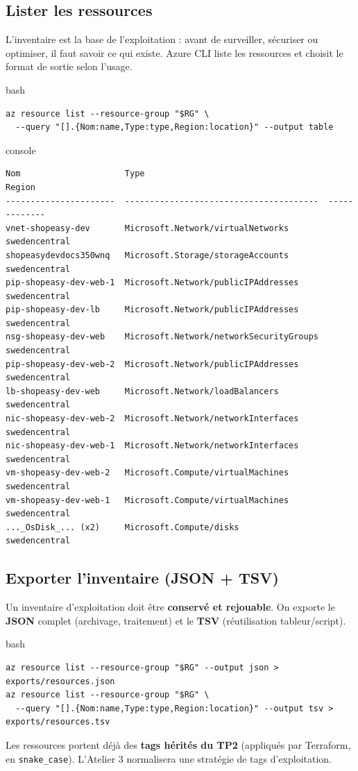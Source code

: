 \documentclass[11pt,a4paper]{article}
\newcommand{\code}[1]{\texttt{#1}}
\begin{document}
\subsection{Lister les ressources}
L'inventaire est la base de l'exploitation : avant de surveiller, sécuriser ou optimiser, il faut savoir ce qui existe. Azure CLI liste les ressources et choisit le format de sortie selon l'usage.
\begin{codebox}{bash}
\begin{Verbatim}
az resource list --resource-group "$RG" \
  --query "[].{Nom:name,Type:type,Region:location}" --output table
\end{Verbatim}
\end{codebox}
\begin{codebox}{console}
\begin{Verbatim}
Nom                     Type                                     Region
----------------------  ---------------------------------------  -------------
vnet-shopeasy-dev       Microsoft.Network/virtualNetworks        swedencentral
shopeasydevdocs350wnq   Microsoft.Storage/storageAccounts        swedencentral
pip-shopeasy-dev-web-1  Microsoft.Network/publicIPAddresses      swedencentral
pip-shopeasy-dev-lb     Microsoft.Network/publicIPAddresses      swedencentral
nsg-shopeasy-dev-web    Microsoft.Network/networkSecurityGroups  swedencentral
pip-shopeasy-dev-web-2  Microsoft.Network/publicIPAddresses      swedencentral
lb-shopeasy-dev-web     Microsoft.Network/loadBalancers          swedencentral
nic-shopeasy-dev-web-2  Microsoft.Network/networkInterfaces      swedencentral
nic-shopeasy-dev-web-1  Microsoft.Network/networkInterfaces      swedencentral
vm-shopeasy-dev-web-2   Microsoft.Compute/virtualMachines        swedencentral
vm-shopeasy-dev-web-1   Microsoft.Compute/virtualMachines        swedencentral
..._OsDisk_... (x2)     Microsoft.Compute/disks                  swedencentral
\end{Verbatim}
\end{codebox}

\subsection{Exporter l'inventaire (JSON + TSV)}
Un inventaire d'exploitation doit être \textbf{conservé et rejouable}. On exporte le \textbf{JSON} complet (archivage, traitement) et le \textbf{TSV} (réutilisation tableur/script).
\begin{codebox}{bash}
\begin{Verbatim}
az resource list --resource-group "$RG" --output json > exports/resources.json
az resource list --resource-group "$RG" \
  --query "[].{Nom:name,Type:type,Region:location}" --output tsv > exports/resources.tsv
\end{Verbatim}
\end{codebox}
Les ressources portent déjà des \textbf{tags hérités du TP2} (appliqués par Terraform, en \code{snake\_case}). L'Atelier 3 normalisera une stratégie de tags d'exploitation.
\end{document}

